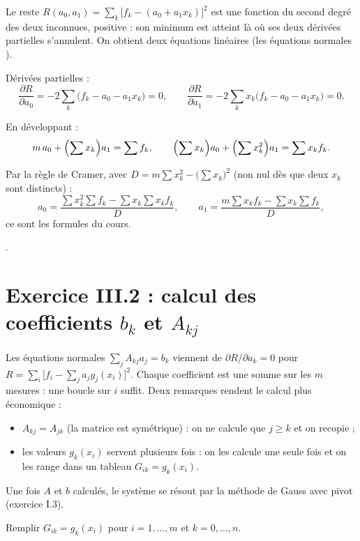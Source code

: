 \Pourquoi Le reste $R(a_0, a_1) = \sum_k\bigl[f_k - (a_0 + a_1x_k)\bigr]^2$ est
une fonction du second degré des deux inconnues, positive : son minimum est
atteint là où ses deux dérivées partielles s'annulent. On obtient deux
équations linéaires (les \og équations normales \fg).

\Etapes
{} Dérivées partielles :
\[
  \frac{\partial R}{\partial a_0} = -2\sum_k\bigl(f_k - a_0 - a_1x_k\bigr) = 0,
  \qquad
  \frac{\partial R}{\partial a_1} = -2\sum_k x_k\bigl(f_k - a_0 - a_1x_k\bigr) = 0 .
\]

 En développant :
\[
  m\,a_0 + \Bigl(\sum x_k\Bigr)a_1 = \sum f_k, \qquad
  \Bigl(\sum x_k\Bigr)a_0 + \Bigl(\sum x_k^2\Bigr)a_1 = \sum x_kf_k .
\]

 Par la règle de Cramer, avec $D = m\sum x_k^2 - \bigl(\sum x_k\bigr)^2$
(non nul dès que deux $x_k$ sont distincts) :
\[
  a_0 = \frac{\sum x_k^2\sum f_k - \sum x_k\sum x_kf_k}{D}, \qquad
  a_1 = \frac{m\sum x_kf_k - \sum x_k\sum f_k}{D} ,
\]
ce sont les formules du cours.

\Refs {}.

\section{\texorpdfstring{Exercice III.2 : calcul des coefficients $b_k$ et $A_{kj}$}{Exercice III.2 : calcul des coefficients bk et Akj}}


\Pourquoi Les équations normales $\sum_j A_{kj}a_j = b_k$ viennent de
$\partial R/\partial a_k = 0$ pour
$R = \sum_i\bigl[f_i - \sum_j a_jg_j(x_i)\bigr]^2$. Chaque coefficient est une
somme sur les $m$ mesures : une boucle sur $i$ suffit. Deux remarques rendent
le calcul plus économique :
\begin{itemize}
  \item $A_{kj} = A_{jk}$ (la matrice est symétrique) : on ne calcule que
        $j \ge k$ et on recopie ;
  \item les valeurs $g_k(x_i)$ servent plusieurs fois : on les calcule une seule
        fois et on les range dans un tableau $G_{ik} = g_k(x_i)$.
\end{itemize}
Une fois $A$ et $b$ calculés, le système se résout par la méthode de Gauss
avec pivot (exercice I.3).

\Etapes
{} Remplir $G_{ik} = g_k(x_i)$ pour $i = 1, \dots, m$ et
$k = 0, \dots, n$.

